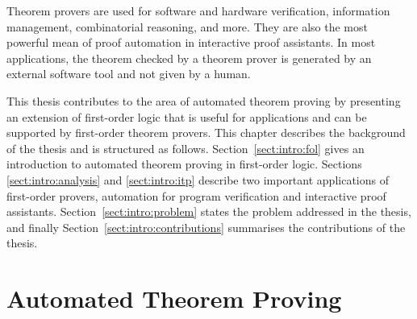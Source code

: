 {Theorem provers are used for software and hardware verification, information management, combinatorial reasoning, and more. They are also the most powerful mean of proof automation in interactive proof assistants. In most applications, the theorem checked by a theorem prover is generated by an external software tool and not given by a human. %

This thesis contributes to the area of automated theorem proving by presenting an extension of first-order logic that is useful for applications and can be supported by first-order theorem provers. This chapter describes the background of the thesis and is structured as follows. Section~\ref{sect:intro:fol} gives an introduction to automated theorem proving in first-order logic. Sections \ref{sect:intro:analysis} and \ref{sect:intro:itp} describe two important applications of first-order provers, automation for program verification and interactive proof assistants. Section~\ref{sect:intro:problem} states the problem addressed in the thesis, and finally Section~\ref{sect:intro:contributions} summarises the contributions of the thesis.
}


\section*{Automated Theorem Proving}

